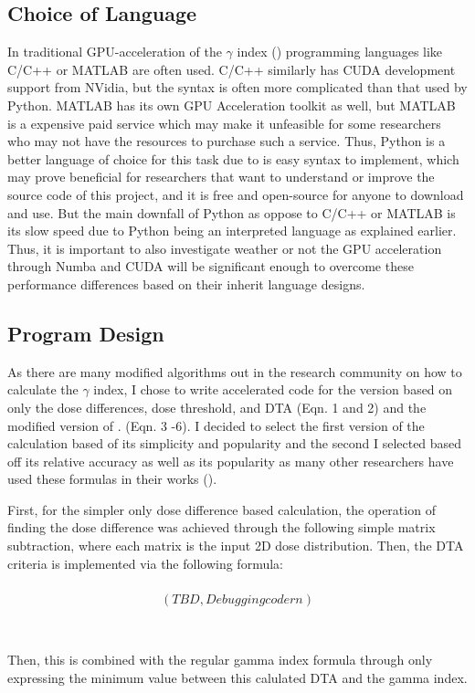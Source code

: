 \documentclass[12pt]{article}
\begin{document}
\subsection{Choice of Language}
In traditional GPU-acceleration of the $\gamma$ index (\textcite{Gu}) programming languages like C/C++ or MATLAB are often used. C/C++ similarly has CUDA development support from NVidia, but the syntax is often more complicated than that used by Python. MATLAB has its own GPU Acceleration toolkit as well, but MATLAB is a expensive paid service which may make it unfeasible for some researchers who may not have the resources to purchase such a service. Thus, Python is a better language of choice for this task due to is easy syntax to implement, which may prove beneficial for researchers that want to understand or improve the source code of this project, and it is free and open-source for anyone to download and use. But the main downfall of Python as oppose to C/C++ or MATLAB is its slow speed due to Python being an interpreted language as explained earlier. Thus, it is important to also investigate weather or not the GPU acceleration through Numba and CUDA will be significant enough to overcome these performance differences based on their inherit language designs.

\subsection{Program Design}
As there are many modified algorithms out in the research community on how to calculate the $\gamma$ index, I chose to write accelerated code for the version based on only the dose differences, dose threshold, and DTA (Eqn. 1 and 2) and the modified version of \textcite{Low}. (Eqn. 3 -6). I decided to select the first version of the calculation based of its simplicity and popularity and the second I selected based off its relative accuracy as well as its popularity as many other researchers have used these formulas in their works (\textcite{Gu}).

First, for the simpler only dose difference based calculation, the operation of finding the dose difference was achieved through the following simple matrix subtraction, where each matrix is the input 2D dose distribution. Then, the DTA criteria is implemented via the following formula:
\\
\\
\begin{align}
  (TBD, Debugging code rn) \\
\end{align}
\\
\\
Then, this is combined with the regular gamma index formula through only expressing the minimum value between this calulated DTA and the gamma index.
\end{document}
